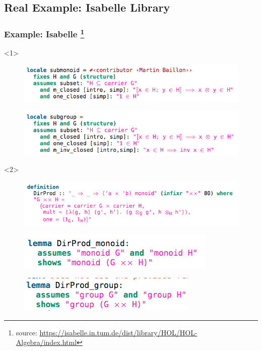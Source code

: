 \documentclass[t,12pt,numbers,fleqn,usenames,xcolor=dvipsnames]{beamer}
\begin{document}
\subsection{Real Example: Isabelle Library}
\begin{frame}[fragile]
\frametitle{Example: Isabelle \footnote{source: \url{https://isabelle.in.tum.de/dist/library/HOL/HOL-Algebra/index.html}}}
\begin{flushleft}
\begin{onlyenv}<1>
\begin{figure}
	\includegraphics[scale=0.4]{isabelle_example/submonoid.png}
\end{figure}
\begin{figure}
	\includegraphics[scale=0.4]{isabelle_example/subgroup.png}
\end{figure}
\end{onlyenv}
\begin{onlyenv}<2>
	\begin{figure}
	\includegraphics[scale=0.4]{isabelle_example/prod.png}
\end{figure}
\begin{figure}
	\includegraphics[scale=0.4]{isabelle_example/prod_mon.png}
\end{figure}
\begin{figure}
	\includegraphics[scale=0.4]{isabelle_example/prod_group.png}
\end{figure}
\end{onlyenv}
\end{flushleft}
\end{frame}
\end{document}
